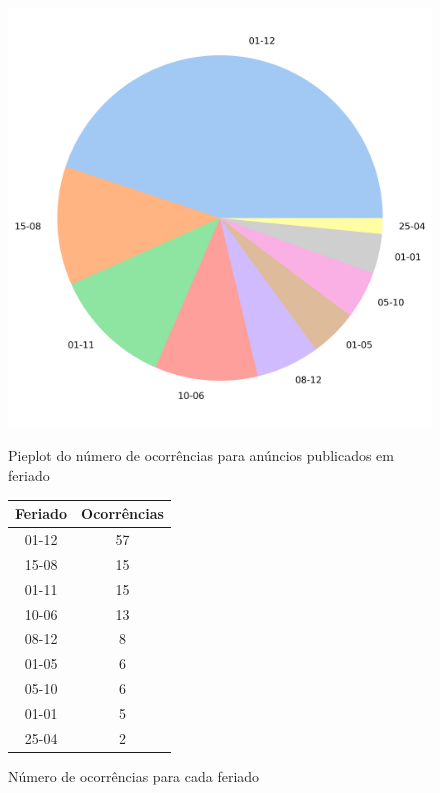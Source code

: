 \begin{figure}[H]
	\centering
	\begin{minipage}{.6\linewidth}
		\includegraphics[width=\textwidth]{imagens/pieplot.png}
		\caption{Pieplot do número de ocorrências para anúncios publicados em feriado}
		
	\end{minipage}
	\hfill
	\begin{minipage}{.38\linewidth}
		
			\begin{tabular}{|c|c|}
				\hline
				\textbf{Feriado} & \textbf{Ocorrências} \\ \hline
				01-12            & 57                   \\ \hline
				15-08            & 15                   \\ \hline
				01-11            & 15                   \\ \hline
				10-06            & 13                   \\ \hline
				08-12            & 8                    \\ \hline
				01-05            & 6                    \\ \hline
				05-10            & 6                    \\ \hline
				01-01            & 5                    \\ \hline
				25-04            & 2                    \\ \hline
			\end{tabular}
			\caption{Número de ocorrências para cada feriado}
	\end{minipage}
\end{figure}





